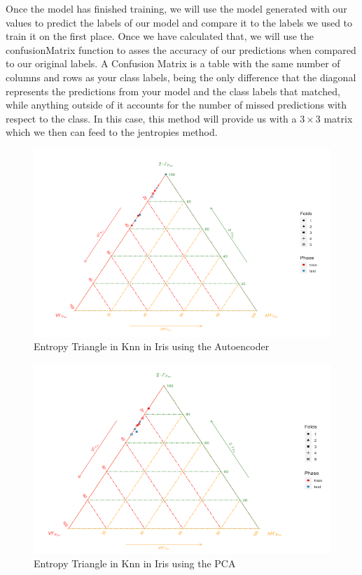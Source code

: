 Once the model has finished training, we will use the model generated with our values to predict the labels of our model and compare it to the labels we used to train it on the first place. Once we have calculated that, we will use the confusionMatrix function to asses the accuracy of our predictions when compared to our original labels. A Confusion Matrix is a table with the same number of columns and rows as your class labels, being the only difference that the diagonal represents the predictions from your model and the class labels that matched, while anything outside of it accounts for the number of missed predictions with respect to the class. In this case, this method will provide us with a $3\times3$ matrix which we then can feed to the jentropies method. \par


\begin{figure}[H]
	\centering
	\includegraphics[width=1.2\linewidth]{Figuras_tfg/ET_knn_iris_auto}
	\caption{Entropy Triangle in Knn in Iris using the Autoencoder}
	\label{fig:figure_Knn_Iris_ET_Auto}
\end{figure}

\begin{figure}[H]
	\centering
	\includegraphics[width=1.2\linewidth]{Figuras_tfg/ET_knn_iris_pca}
	\caption{Entropy Triangle in Knn in Iris using the PCA}
	\label{fig:figure_Knn_Iris_ET_PCA}
\end{figure}

